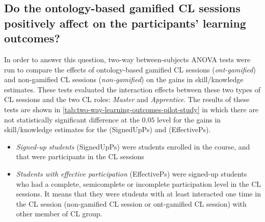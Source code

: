 \newpage
\subsection*{Do the ontology-based gamified CL sessions positively affect on the participants' learning outcomes?}

In order to answer this question, two-way between-subjects ANOVA tests were run to compare the effects of ontology-based gamified CL sessions (\emph{ont-gamified}) and non-gamified CL sessions (\emph{non-gamified}) on the gains in skill/knowledge estimates. These tests evaluated the interaction effects between these two types of CL sessions and the two CL roles: \emph{Master} and \emph{Apprentice}. The results of these tests are shown in \autoref{tab:two-way-learning-outcomes-pilot-study} in which there are not statistically significant difference at the $0.05$ level for the gains in skill/knowledge estimates for the  (SignedUpPs) and  (EffectivePs).
\begin{itemize}
\item 
\emph{Signed-up students} (SignedUpPs) were students enrolled in the course, and that were participants in the CL sessions
\item
\emph{Students with effective participation} (EffectivePs) were signed-up students who had a complete, semicomplete or incomplete participation level in the CL sessions. It means that they were students with at least interacted one time in the CL session (non-gamified CL session or ont-gamified CL session) with other member of CL group.
\end{itemize}


